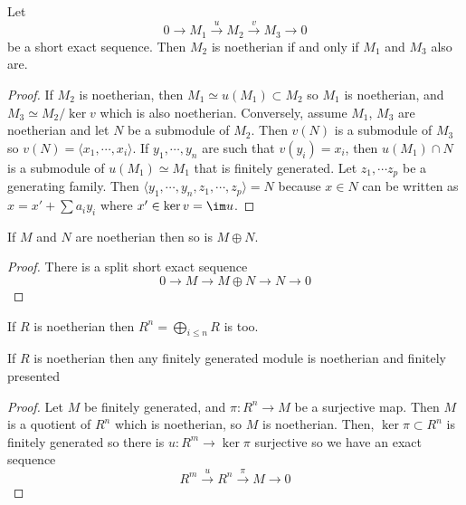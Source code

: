 \begin{prop}
Let  \[
0 \longrightarrow M_1 \overset u\longrightarrow M_2\overset v\longrightarrow  M_3 \longrightarrow 0
\] 
be a short exact sequence. Then $M_2$ is noetherian  if and only if $M_1$ and  $M_3 $ also are.
\end{prop}

\begin{proof}
If $M_2$ is noetherian, then $M_1\simeq u(M_1)\subset M_2$ so $M_1$ is noetherian, and $M_3\simeq M_2 / \ker v$ which is also noetherian.
Conversely, assume $M_1$, $M_3$ are noetherian and let $N$ be a submodule of $M_2$. Then  $v(N)$ is a submodule of  $M_3$ so  $v(N)= \langle x_1, \cdots , x_i\rangle $. If  $y_1, \cdots, y_n$ are such that  $v(y_i)=x_i$, then  $u(M_1)\cap N$ is a submodule of  $u(M_1)\simeq M_1$ that is finitely generated. Let  $z_1, \cdots z_p$ be a generating family. Then  $\langle y_1, \cdots, y_n, z_1, \cdots, z_p\rangle =N$ because  $x \in  N$ can be written as $x = x' + \sum a_i y_i$ where $x' \in  \ker v=\im u$.
\end{proof}

\begin{cor}
If $M$ and  $N$ are  noetherian then so is $M\oplus N$.
\end{cor}

\begin{proof}
    There is a split short exact sequence \[0 \longrightarrow  M \longrightarrow M\oplus N \longrightarrow  N \longrightarrow  0\]
\end{proof}

\begin{cor}
If $R$ is noetherian then  $R^n = \bigoplus_{i\leq n}R$ is too.
\end{cor}


\begin{cor}
If $R$ is noetherian then any finitely generated module is noetherian and finitely presented
\end{cor}

\begin{proof}
Let $M$ be finitely generated, and  $\pi : R^n \longrightarrow  M$ be a surjective map. Then $M$ is a quotient of  $R^n$ which is noetherian, so  $M$ is noetherian. Then,  $\ker \pi \subset R^n$ is finitely generated so there is  $u : R^m \longrightarrow  \ker \pi$ surjective so we have an exact sequence \[
R^m \overset u\longrightarrow  R^n\overset \pi\longrightarrow M\longrightarrow 0
\] 
\end{proof}


